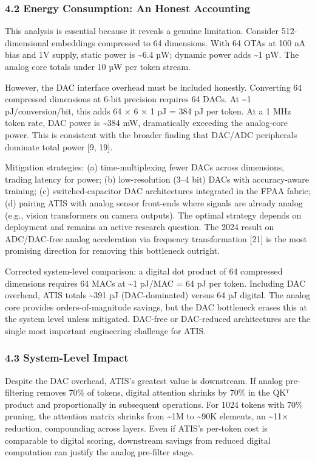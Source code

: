 \subsubsection{4.2 Energy Consumption: An Honest
Accounting}\label{energy-consumption-an-honest-accounting}

This analysis is essential because it reveals a genuine limitation.
Consider 512-dimensional embeddings compressed to 64 dimensions. With 64
OTAs at 100 nA bias and 1V supply, static power is \textasciitilde6.4
µW; dynamic power adds \textasciitilde1 µW. The analog core totals under
10 µW per token stream.

However, the DAC interface overhead must be included honestly.
Converting 64 compressed dimensions at 6-bit precision requires 64 DACs.
At \textasciitilde1 pJ/conversion/bit, this adds 64 × 6 × 1 pJ = 384 pJ
per token. At a 1 MHz token rate, DAC power is \textasciitilde384 mW,
dramatically exceeding the analog-core power. This is consistent with
the broader finding that DAC/ADC peripherals dominate total power {[}9,
19{]}.

Mitigation strategies: (a) time-multiplexing fewer DACs across
dimensions, trading latency for power; (b) low-resolution (3--4 bit)
DACs with accuracy-aware training; (c) switched-capacitor DAC
architectures integrated in the FPAA fabric; (d) pairing ATIS with
analog sensor front-ends where signals are already analog (e.g., vision
transformers on camera outputs). The optimal strategy depends on
deployment and remains an active research question. The 2024 result on
ADC/DAC-free analog acceleration via frequency transformation {[}21{]}
is the most promising direction for removing this bottleneck outright.

Corrected system-level comparison: a digital dot product of 64
compressed dimensions requires 64 MACs at \textasciitilde1 pJ/MAC = 64
pJ per token. Including DAC overhead, ATIS totals \textasciitilde391 pJ
(DAC-dominated) versus 64 pJ digital. The analog core provides
orders-of-magnitude savings, but the DAC bottleneck erases this at the
system level unless mitigated. DAC-free or DAC-reduced architectures are
the single most important engineering challenge for ATIS.

\subsubsection{4.3 System-Level Impact}\label{system-level-impact}

Despite the DAC overhead, ATIS's greatest value is downstream. If analog
pre-filtering removes 70\% of tokens, digital attention shrinks by 70\%
in the QKᵀ product and proportionally in subsequent operations. For 1024
tokens with 70\% pruning, the attention matrix shrinks from
\textasciitilde1M to \textasciitilde90K elements, an \textasciitilde11×
reduction, compounding across layers. Even if ATIS's per-token cost is
comparable to digital scoring, downstream savings from reduced digital
computation can justify the analog pre-filter stage.


